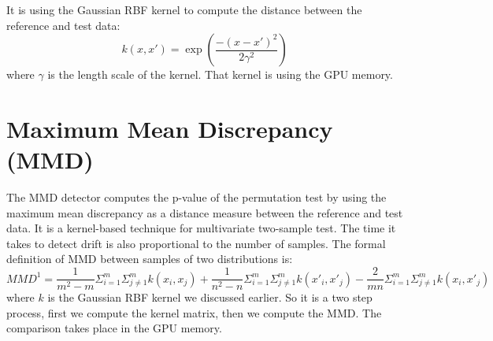 \documentclass[12pt]{report}
\begin{document}
It is using the Gaussian RBF kernel to compute the distance between the reference and test data:
\[ k(x,x') = \exp(\frac{-(x-x')^2}{2\gamma^2}) \]
where \(\gamma\) is the length scale of the kernel.
That kernel is using the GPU memory.


%
%

\section{Maximum Mean Discrepancy (MMD)}

The MMD detector computes the p-value of the permutation test by using the maximum mean discrepancy as a distance measure between the reference and test data.
It is a kernel-based technique for multivariate two-sample test.
The time it takes to detect drift is also proportional to the number of samples.
The formal definition of MMD between samples of two distributions is:
\[ MMD^1 = \frac{1}{m^2-m} \Sigma_{i=1}^{m}\Sigma_{j\neq 1}^{m}k(x_i,x_j) + \frac{1}{n^2-n}\Sigma_{i=1}^{m}\Sigma_{j\neq 1}^{m}k(x'_i,x'_j) - \frac{2}{mn}\Sigma_{i=1}^{m}\Sigma_{j\neq 1}^{m}k(x_i,x'_j) \]
where \(k\) is the Gaussian RBF kernel we discussed earlier.
So it is a two step process, first we compute the kernel matrix, then we compute the MMD.
The comparison takes place in the GPU memory.
\end{document}

